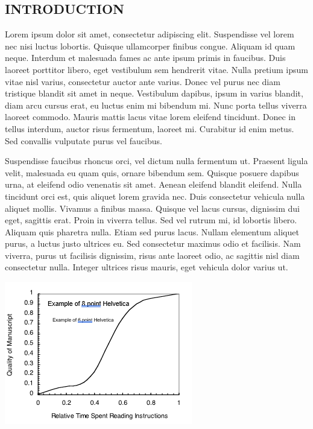 \documentclass[10pt]{article}
\begin{document}
\begin{multicols}{2}
\section{INTRODUCTION}
Lorem ipsum dolor sit amet, consectetur adipiscing elit. Suspendisse vel lorem nec nisi luctus lobortis. Quisque ullamcorper finibus congue. Aliquam id quam neque. Interdum et malesuada fames ac ante ipsum primis in faucibus. Duis laoreet porttitor libero, eget vestibulum sem hendrerit vitae. Nulla pretium ipsum vitae nisl varius, consectetur auctor ante varius. Donec vel purus nec diam tristique blandit sit amet in neque. Vestibulum dapibus, ipsum in varius blandit, diam arcu cursus erat, eu luctus enim mi bibendum mi. Nunc porta tellus viverra laoreet commodo. Mauris mattis lacus vitae lorem eleifend tincidunt. Donec in tellus interdum, auctor risus fermentum, laoreet mi. Curabitur id enim metus. Sed convallis vulputate purus vel faucibus.

Suspendisse faucibus rhoncus orci, vel dictum nulla fermentum ut. Praesent ligula velit, malesuada eu quam quis, ornare bibendum sem. Quisque posuere dapibus urna, at eleifend odio venenatis sit amet. Aenean eleifend blandit eleifend. Nulla tincidunt orci est, quis aliquet lorem gravida nec. Duis consectetur vehicula nulla aliquet mollis. Vivamus a finibus massa. Quisque vel lacus cursus, dignissim dui eget, sagittis erat. Proin in viverra tellus. Sed vel rutrum mi, id lobortis libero. Aliquam quis pharetra nulla. Etiam sed purus lacus. Nullam elementum aliquet purus, a luctus justo ultrices eu. Sed consectetur maximus odio et facilisis. Nam viverra, purus ut facilisis dignissim, risus ante laoreet odio, ac sagittis nisl diam consectetur nulla. Integer ultrices risus mauris, eget vehicula dolor varius ut.

\vspace{12pt}

\noindent
\includegraphics[width=\linewidth]{img.png}


\end{multicols}
\end{document}
